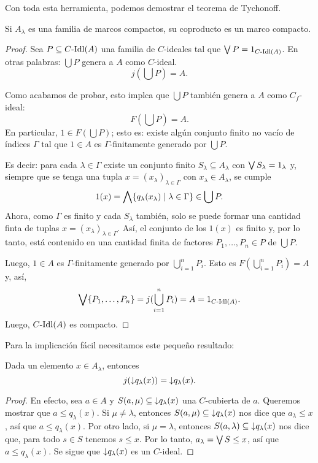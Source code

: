 Con toda esta herramienta, podemos demostrar el teorema
de Tychonoff.
\begin{lemma}
  Si $A_\lambda$ es una familia de marcos compactos, su coproducto es
  un marco compacto.
\end{lemma}
\begin{proof}
  Sea $P\subseteq C\text{-}\mathrm{Idl}(A)$ una familia de $C$-ideales tal que
  $\bigvee P = 1_{C\text{-}\mathrm{Idl}(A)}$.
  En otras palabras: $\bigcup P$ genera a $A$ como $C$-ideal.
  \[
      j(\bigcup P) = A
  .\]
  
  Como acabamos de probar, esto implca que $\bigcup P$ también
  genera a $A$ como $C_f$-ideal:
  \[
      F(\bigcup P)=A
  .\]
  En particular, $1\in F(\bigcup P)$; esto es:
  existe algún conjunto finito no vacío de índices $\Gamma$
  tal que $1\in A$ es $\Gamma$-finitamente generado por
  $\bigcup P$.

  Es decir: para cada $\lambda\in\Gamma$ existe un conjunto
  finito $S_\lambda\subseteq A_\lambda$
  con $\bigvee S_\lambda = 1_\lambda$
  y, siempre que se tenga una tupla
  $x=(x_\lambda)_{\lambda\in\Gamma}$
  con $x_\lambda\in A_\lambda$,
  se cumple
  \[
      1(x)
      =\bigwedge\{q_\lambda(x_\lambda)\mid\lambda\in\Gamma\}
      \in\bigcup P
  .\]
  Ahora, como $\Gamma$ es finito y cada $S_\lambda$
  también, solo se puede formar
  una cantidad finta de tuplas
  $x=(x_\lambda)_{\lambda\in\Gamma}$.
  Así, el conjunto de los $1(x)$ es finito y, por lo tanto,
  está contenido en una cantidad finita de factores
  $P_1,\dots,P_n\in P$ de $\bigcup P$.
  
  Luego, $1\in A$ es $\Gamma$-finitamente generado
  por $\bigcup_{i=1}^nP_i$.
  Esto es $F(\bigcup_{i=1}^n P_i)=A$ y, así,
  \[
      \bigvee\{P_1,\dots,P_n\}
      = j(\bigcup_{i=1}^nP_i)
      = A
      = 1_{C\text{-}\mathrm{Idl}(A)}
  .\]
  Luego, $C\text{-}\mathrm{Idl}(A)$ es compacto.
\end{proof}


Para la implicación fácil necesitamos este pequeño resultado:
\begin{lemma}
Dada un elemento $x\in A_\lambda$, entonces
\[
    j({\downarrow} q_\lambda(x)) = {\downarrow} q_\lambda(x)
.\]
\end{lemma}
\begin{proof}
    En efecto, sea $a\in A$ y $S(a,\mu)\subseteq{\downarrow} q_\lambda(x)$
    una $C$-cubierta de $a$.
    Queremos mostrar que $a\leq q_\lambda(x)$.
    Si $\mu\neq\lambda$, entonces $S(a,\mu)\subseteq {\downarrow} q_\lambda(x)$
    nos dice que $a_\lambda\leq x$, así que $a\leq q_\lambda(x)$.
    Por otro lado, si $\mu=\lambda$, entonces
    $S(a,\lambda) \subseteq {\downarrow} q_\lambda(x)$ nos dice que, para todo
    $s\in S$ tenemos $s\leq x$.
    Por lo tanto, $a_\lambda=\bigvee S\leq x$, así que $a\leq q_\lambda(x)$.
    Se sigue que ${\downarrow} q_\lambda(x)$ es un $C$-ideal.
\end{proof}

